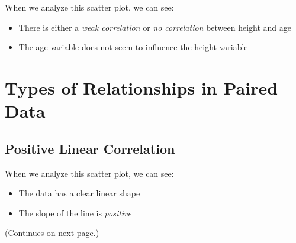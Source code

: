 \documentclass{article}
\begin{document}
When we analyze this scatter plot, we can see:
\begin{itemize}
       \item There is either a \emph{weak correlation} or \emph{no correlation }between height and age
       \item The age variable does not seem to influence the height variable
\end{itemize}

\section{Types of Relationships in Paired Data}
\subsection{Positive Linear Correlation}
\begin{center}
\end{center}

When we analyze this scatter plot, we can see:
\begin{itemize}
       \item The data has a clear linear shape
       \item The slope of the line is \emph{positive}
\end{itemize}
\vfill
\begin{center}
       (Continues on next page.)
\end{center}

\newpage
\end{document}
